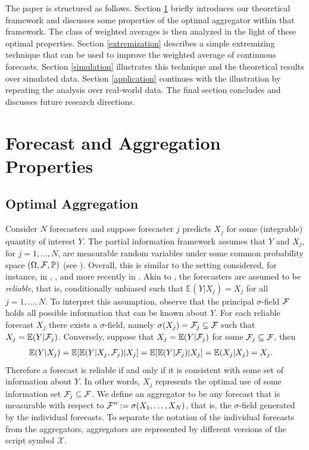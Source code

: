 \documentclass[11pt]{article}
\renewcommand{\P}{\mathbb{P}}
\newcommand{\E}{\mathbb{E}}
\theoremstyle{definition}
\theoremstyle{definition}
\def\F{{\cal F}}
\def\P{{\mathbb P}}
\def\E{{\mathbb E}}
\begin{document}
The paper is structured as follows. Section \ref{propertiesS} briefly
introduces our theoretical framework and discusses some properties of
the optimal aggregator within that framework. The class of weighted
averages is then analyzed in the light of these optimal
properties. Section \ref{extremization} describes a simple extremizing
technique that can be used to improve the weighted average of
continuous forecasts. Section \ref{simulation} illustrates this
technique and the theoretical results over simulated
data. Section \ref{application} continues with the illustration by
repeating the analysis over real-world data. The final section
concludes and discusses future research directions.

\section{Forecast and Aggregation Properties} \label{propertiesS}
\subsection{Optimal Aggregation}


Consider $N$ forecasters and suppose forecaster $j$ predicts $X_j$ for
some (integrable) quantity of interest $Y$.  The partial information
framework assumes that $Y$ and $X_j$, for $j = 1, \dots, N$, are
measurable random variables under some common probability space
$(\Omega, \F , \P)$ (see \citealt{satopaamodeling}). Overall, this is similar to the setting
considered, for instance,
in \cite{degroot1981assessing}, \cite{murphy1987general}, and more
recently in \cite{Ranjan08}. Akin to \cite{Ranjan08}, the forecasters
are assumed to be \textit{reliable}, that is, conditionally unbiased
such that $\E(Y | X_j) = X_j$ for all $j = 1, \dots, N$.  To interpret
this assumption, observe that the principal $\sigma$-field $\F$ holds
all possible information that can be known about $Y$. For each
reliable forecast $X_j$ there exists a $\sigma$-field, namely
$\sigma(X_j) = \F_j \subseteq \F$ such that $X_j
= \E(Y|\F_j)$. Conversely, suppose that $X_j = \E(Y|\F_j)$ for some
$\F_j \subseteq \F$, then
\begin{align*}
\E(Y | X_j) &= \E[\E(Y|X_j,\F_j)|X_j] = \E[\E(Y|\F_j)|X_j] = \E(X_j|X_j) = X_j.
\end{align*}
Therefore a forecast is reliable if and only if it is consistent with some set of information about $Y$. In other words, $X_j$ represents the optimal use of some information set $\F_j \subseteq \F$.
We define an aggregator  to be any forecast that is measurable with respect to $\F'' := \sigma(X_1, \dots, X_N)$, that is, the $\sigma$-field generated by the individual forecasts. To separate the notation of the individual forecasts from the aggregators, aggregators are represented by different versions of the script symbol $\mathcal{X}$. 
\end{document}
